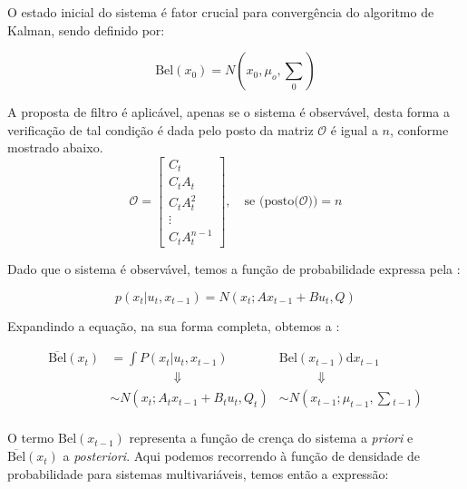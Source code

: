 O estado inicial do sistema é fator crucial para convergência do algoritmo de Kalman, sendo definido por:

\begin{equation}
    \text{Bel}(x_0) = N\left(x_0, \mu_o, {\textstyle\sum} _0\right)
\end{equation}

A proposta de filtro é aplicável, apenas se o sistema é observável, desta forma a verificação de tal condição é dada pelo posto  da matriz $\mathcal {O}$ é igual a $n$, conforme mostrado abaixo.
\begin{equation*}
    \mathcal {O}={\begin{bmatrix}C_t\\C_tA_t\\C_tA^{2}_t\\\vdots \\C_tA^{n-1}_t\end{bmatrix}, \quad \text{se }(\text{posto}(\mathcal {O}})) = n
\end{equation*}

Dado que o sistema é observável, temos a função de probabilidade expressa pela :

\begin{equation}
    \label{eq:bayes01}
        p(x_t| u_t, x_{t-1})= N\left(x_t; Ax_{t-1}+ Bu_t, Q\right)
\end{equation}   

Expandindo a equação, na sua forma completa, obtemos a :

\begin{equation}   
    \label{eq:bayes02}
    \begin{matrix}
        \overline{\text{Bel}}(x_t)  & = \displaystyle\int P(x_t|u_t, x_{t-1}) & \text{Bel}(x_{t-1})\text{d}x_{t-1} \\
        & \quad\quad\quad\quad\quad \Downarrow & \quad\quad\quad\Downarrow \\
        & \sim N\left(x_t; A_t x_{t-1}+ B_tu_t, Q_t\right) & \sim N\left(x_{t-1}; \mu_{t-1}, \textstyle\sum {}_{t-1}\right) \\
    \end{matrix}
\end{equation}

O termo $\text{Bel}(x_{t-1})$ representa a função de crença do sistema a \textit{priori} e $\overline{\text{Bel}}(x_t)$ a \textit{posteriori}. Aqui podemos recorrendo à função de densidade de probabilidade para sistemas multivariáveis, temos então a expressão:

